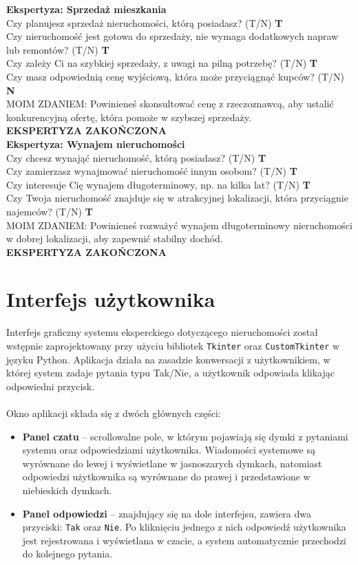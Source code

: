 \noindent \textbf{Ekspertyza: Sprzedaż mieszkania}\\
\noindent Czy planujesz sprzedaż nieruchomości, którą posiadasz? (T/N) \textbf{T} \\
\noindent Czy nieruchomość jest gotowa do sprzedaży, nie wymaga dodatkowych napraw lub remontów? (T/N) \textbf{T} \\
\noindent Czy zależy Ci na szybkiej sprzedaży, z uwagi na pilną potrzebę? (T/N) \textbf{T} \\
\noindent Czy masz odpowiednią cenę wyjściową, która może przyciągnąć kupców? (T/N) \textbf{N} \\
MOIM ZDANIEM: Powinieneś skonsultować cenę z rzeczoznawcą, aby ustalić konkurencyjną ofertę, która pomoże w szybszej sprzedaży.\\
\textbf{EKSPERTYZA ZAKOŃCZONA}\\

\noindent \textbf{Ekspertyza: Wynajem nieruchomości}\\
\noindent Czy chcesz wynająć nieruchomość, którą posiadasz? (T/N) \textbf{T} \\
\noindent Czy zamierzasz wynajmować nieruchomość innym osobom? (T/N) \textbf{T} \\
\noindent Czy interesuje Cię wynajem długoterminowy, np. na kilka lat? (T/N) \textbf{T} \\
\noindent Czy Twoja nieruchomość znajduje się w atrakcyjnej lokalizacji, która przyciągnie najemców? (T/N) \textbf{T} \\
MOIM ZDANIEM: Powinieneś rozważyć wynajem długoterminowy nieruchomości w dobrej lokalizacji, aby zapewnić stabilny dochód.\\
\textbf{EKSPERTYZA ZAKOŃCZONA}\\

\section{Interfejs użytkownika}
Interfejs graficzny systemu eksperckiego dotyczącego nieruchomości został wstępnie zaprojektowany przy użyciu bibliotek \texttt{Tkinter} oraz \texttt{CustomTkinter} w języku Python. Aplikacja działa na zasadzie konwersacji z użytkownikiem, w której system zadaje pytania typu Tak/Nie, a użytkownik odpowiada klikając odpowiedni przycisk.
\\ \\
Okno aplikacji składa się z dwóch głównych części:
\begin{itemize}
    \item \textbf{Panel czatu} -- scrollowalne pole, w którym pojawiają się dymki z pytaniami systemu oraz odpowiedziami użytkownika. Wiadomości systemowe są wyrównane do lewej i wyświetlane w jasnoszarych dymkach, natomiast odpowiedzi użytkownika są wyrównane do prawej i przedstawione w niebieskich dymkach.
    \item \textbf{Panel odpowiedzi} -- znajdujący się na dole interfejsu, zawiera dwa przyciski: \texttt{Tak} oraz \texttt{Nie}. Po kliknięciu jednego z nich odpowiedź użytkownika jest rejestrowana i wyświetlana w czacie, a system automatycznie przechodzi do kolejnego pytania.
\end{itemize}

